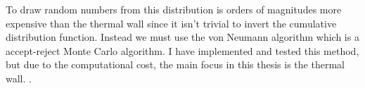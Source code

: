 To draw random numbers from this distribution is orders of magnitudes more expensive than the thermal wall since it isn't trivial to invert the cumulative distribution function. Instead we must use the von Neumann algorithm which is a accept-reject Monte Carlo algorithm\cite{allen1989computer}. I have implemented and tested this method, but due to the computational cost, the main focus in this thesis is the thermal wall. .